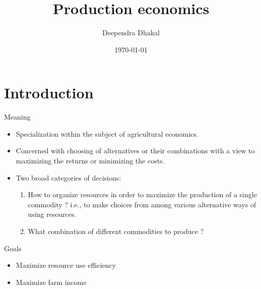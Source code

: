 \documentclass[12pt,ignorenonframetext,aspectratio=169]{beamer}
\title{\insertsectionhead}
  {
    \definecolor{white}{rgb}{0.776,0.357,0.157}
    \definecolor{iqss@orange}{rgb}{1,1,1}
    \ifnum \insertmainframenumber > \insertframenumber
    \frame{
      \frametitle{\iqsssectiontitleheader}
      \tableofcontents[currentsection]
    }
    \else
    \frame{
      \frametitle{Backup Slides}
      \tableofcontents[sectionstyle=shaded/shaded,subsectionstyle=shaded/shaded/shaded]
    }
    \fi
  }
\title[]{Production economics}
\author[
        Deependra Dhakal
    ]{Deependra Dhakal}
\institute[
    ]{
    GAASC, Baitadi \and Tribhuwan University
    }
\date[
      \today
  ]{
      \today
        }
\providecommand{\tightlist}{%
  \setlength{\itemsep}{0pt}\setlength{\parskip}{0pt}}
\begin{document}
  \begin{frame}[plain]
  \titlepage
  \end{frame}



\hypertarget{introduction}{%
\section{Introduction}\label{introduction}}

\begin{frame}{Meaning}
\protect\hypertarget{meaning}{}

\begin{itemize}
\tightlist
\item
  Specialization within the subject of agricultural economics.
\item
  Concerned with choosing of alternatives or their combinations with a
  view to maximizing the returns or minimizing the costs.
\item
  Two broad categories of decisions:

  \begin{enumerate}
  \tightlist
  \item
    How to organize resources in order to maximize the production of a
    single commodity ? i.e., to make choices from among various
    alternative ways of using resources.
  \item
    What combination of different commodities to produce ?
  \end{enumerate}
\end{itemize}

\begin{block}{Goals}

\begin{itemize}
\tightlist
\item
  Maximize resource use efficiency
\item
  Maximize farm income
\end{itemize}

\end{block}

\end{frame}
\end{document}
